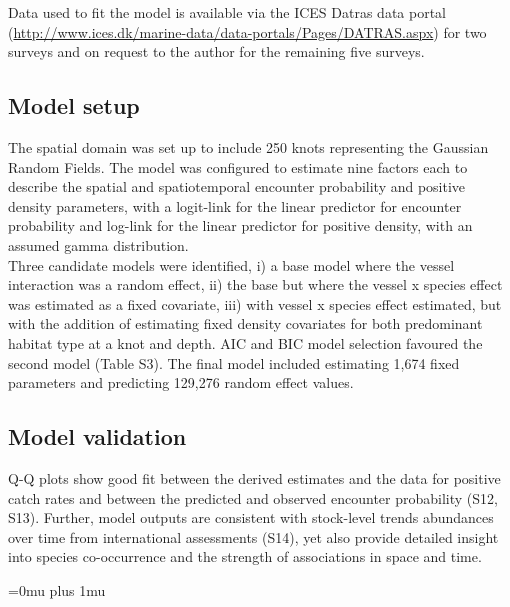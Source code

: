 \documentclass[fleqn,10pt]{wlscirep}
\begin{document}
\begin{linenumbers}
Data used to fit the model is available via the ICES Datras data portal
(\url{http://www.ices.dk/marine-data/data-portals/Pages/DATRAS.aspx}) for two
surveys and on request to the author for the remaining five surveys.\\

\subsection*{Model setup\\}

The spatial domain was set up to include 250 knots representing the Gaussian
Random Fields. The model was configured to estimate nine factors each to describe
the spatial and spatiotemporal encounter probability and positive density
parameters, with a logit-link for the linear predictor for encounter
probability and log-link for the linear predictor for positive density, with an
assumed gamma distribution.\\

Three candidate models were identified, i) a base model where the vessel
interaction was a random effect, ii) the base but where the vessel x species
effect was estimated as a fixed covariate, iii) with vessel x species effect
estimated, but with the addition of estimating fixed density covariates for
both predominant habitat type at a knot and depth. AIC and BIC model selection
favoured the second model (Table S3). The final model included estimating 1,674
fixed parameters and predicting 129,276 random effect values.\\

\subsection*{Model validation\\}

Q-Q plots show good fit between the derived estimates and the data for positive
catch rates and between the predicted and observed encounter probability (S12,
S13).  Further, model outputs are consistent with stock-level trends abundances
over time from international assessments (S14), yet also provide detailed
insight into species co-occurrence and the strength of associations in space
and time. \\

\end{linenumbers}
\newpage
\Urlmuskip=0mu plus 1mu\relax
%

\end{document}
